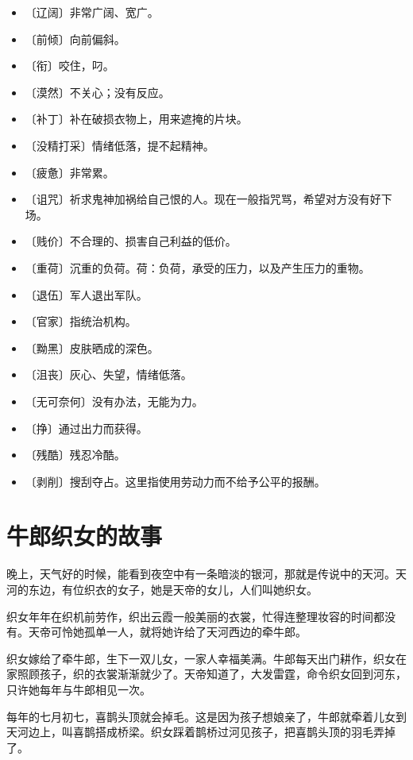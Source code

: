 \documentclass[12pt,UTF-8,openany]{ctexbook}
\begin{document}
\begin{itemize}
    \setlength\itemsep{-0.2em}
    \item 〔辽阔〕非常广阔、宽广。
    \item 〔前倾〕向前偏斜。
    \item 〔衔〕咬住，叼。
    \item 〔漠然〕不关心；没有反应。
    \item 〔补丁〕补在破损衣物上，用来遮掩的片块。
    \item 〔没精打采〕情绪低落，提不起精神。
    \item 〔疲惫〕非常累。
    \item 〔诅咒〕祈求鬼神加祸给自己恨的人。现在一般指咒骂，希望对方没有好下场。
    \item 〔贱价〕不合理的、损害自己利益的低价。
    \item 〔重荷〕沉重的负荷。荷：负荷，承受的压力，以及产生压力的重物。
    \item 〔退伍〕军人退出军队。
    \item 〔官家〕指统治机构。
    \item 〔黝黑〕皮肤晒成的深色。
    \item 〔沮丧〕灰心、失望，情绪低落。
    \item 〔无可奈何〕没有办法，无能为力。
    \item 〔挣〕通过出力而获得。
    \item 〔残酷〕残忍冷酷。
    \item 〔剥削〕搜刮夺占。这里指使用劳动力而不给予公平的报酬。
\end{itemize}

\chapter{牛郎织女的故事}

\begin{large}
    
    晚上，天气好的时候，能看到夜空中有一条暗淡的银河，那就是传说中的天河。天河的东边，有位织衣的女子，她是天帝的女儿，人们叫她织女。
    
    织女年年在织机前劳作，织出云霞一般美丽的衣裳，忙得连整理妆容的时间都没有。天帝可怜她孤单一人，就将她许给了天河西边的牵牛郎。
    
    织女嫁给了牵牛郎，生下一双儿女，一家人幸福美满。牛郎每天出门耕作，织女在家照顾孩子，织的衣裳渐渐就少了。天帝知道了，大发雷霆，命令织女回到河东，只许她每年与牛郎相见一次。
    
    每年的七月初七，喜鹊头顶就会掉毛。这是因为孩子想娘亲了，牛郎就牵着儿女到天河边上，叫喜鹊搭成桥梁。织女踩着鹊桥过河见孩子，把喜鹊头顶的羽毛弄掉了。
    
\end{large}
\end{document}
